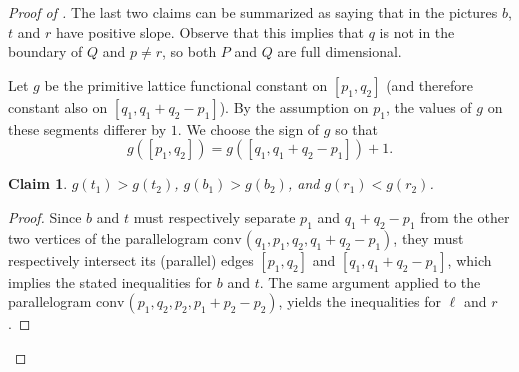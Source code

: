\documentclass{amsart}
\theoremstyle{plain}
\newtheorem{claim}[theorem]{Claim}
\theoremstyle{definition}
\renewcommand{\vec}[1]{\overrightarrow#1}
\newcommand{\conv}{\ensuremath{\mathrm{conv}}\hspace{1pt}}
\begin{document}
\begin{proof}[Proof of ]
The last two claims can be summarized as saying that in the pictures $b$, $t$ and $r$ have positive slope. Observe that this implies that $q$ is not in the boundary of $Q$ and $p \neq r$, so both $P$ and $Q$ are full dimensional.

%
%
%

Let $g$ be the primitive lattice functional constant on $[p_1, q_2]$ (and therefore constant also on $[q_1, q_1+q_2-p_1]$). By the assumption on $p_1$, the values of $g$ on these segments differer by $1$. We choose the sign of $g$ so that 
\[
g([p_1, q_2])= g( [q_1, q_1+q_2-p_1]) +1. 
\]

\begin{claim}
\label{claim:g}
$g(t_1) > g(t_2)$, $g(b_1) > g(b_2)$, and $g(r_1) < g(r_2)$.
\end{claim}

\begin{proof}
Since $b$ and $t$ must respectively separate $p_1$ and $q_1+q_2-p_1$ from the other two vertices of the parallelogram $\conv(q_1, p_1, q_2, q_1+q_2-p_1)$, they must respectively intersect its (parallel) edges $[p_1, q_2]$ and $[q_1, q_1+q_2-p_1]$, which implies the stated inequalities for $b$ and $t$.
The same argument  applied to the parallelogram  $\conv(p_1, q_2, p_2, p_1+p_2-p_2)$, yields the inequalities for $\ell$ and $r$.
\end{proof}


\end{proof}
\end{document}
